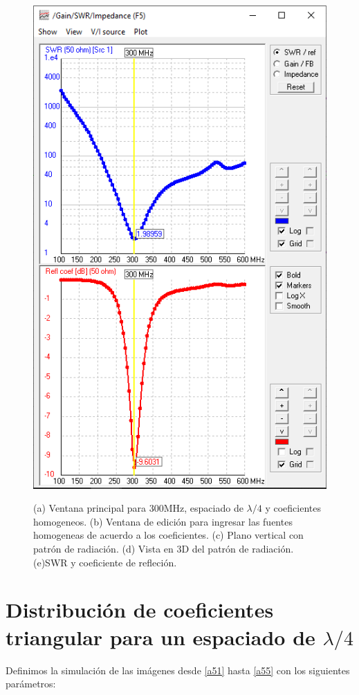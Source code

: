 \documentclass[11pt]{book}
\begin{document}
\begin{figure}[h]
{		\includegraphics[scale=0.35]{IMAGENES/a45}\label{a45}}
	\caption{(a) Ventana principal para 300MHz, espaciado de $\lambda / 4$ y coeficientes homogeneos. (b) Ventana de edición para ingresar las fuentes homogeneas de acuerdo a los coeficientes. (c) Plano vertical con patrón de radiación. (d) Vista en 3D del patrón de radiación. (e)SWR y coeficiente de refleción.}
\end{figure}
\newpage

\section{Distribución de coeficientes triangular para un espaciado de $\lambda/4$}

Definimos la simulación de las imágenes desde \eqref{a51} hasta \eqref{a55} con los siguientes parámetros:
\end{document}

